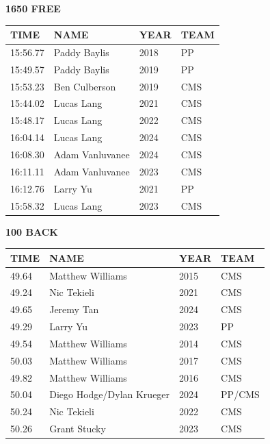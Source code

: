 \begin{table}[H]
\centering
\begin{minipage}[t]{0.48\textwidth}
\centering
\textbf{1650 FREE}\\[0.1cm]
\begin{tabular}{@{}p{1.8cm}p{2.8cm}p{1.2cm}p{1.4cm}@{}}
\hline
    \textbf{TIME} & \textbf{NAME} & \textbf{YEAR} & \textbf{TEAM} \\
\hline
    15:56.77 & Paddy Baylis & 2018 & PP \\
    15:49.57 & Paddy Baylis & 2019 & PP \\
    15:53.23 & Ben Culberson & 2019 & CMS \\
    15:44.02 & Lucas Lang & 2021 & CMS \\
    15:48.17 & Lucas Lang & 2022 & CMS \\
    16:04.14 & Lucas Lang & 2024 & CMS \\
    16:08.30 & Adam Vanluvanee & 2024 & CMS \\
    16:11.11 & Adam Vanluvanee & 2023 & CMS \\
    16:12.76 & Larry Yu & 2021 & PP \\
    15:58.32 & Lucas Lang & 2023 & CMS \\
\hline
\end{tabular}
\end{minipage}\hfill
\begin{minipage}[t]{0.48\textwidth}
\centering
\textbf{100 BACK}\\[0.1cm]
\begin{tabular}{@{}p{1.8cm}p{2.8cm}p{1.2cm}p{1.4cm}@{}}
\hline
    \textbf{TIME} & \textbf{NAME} & \textbf{YEAR} & \textbf{TEAM} \\
\hline
    49.64 & Matthew Williams & 2015 & CMS \\
    49.24 & Nic Tekieli & 2021 & CMS \\
    49.65 & Jeremy Tan & 2024 & CMS \\
    49.29 & Larry Yu & 2023 & PP \\
    49.54 & Matthew Williams & 2014 & CMS \\
    50.03 & Matthew Williams & 2017 & CMS \\
    49.82 & Matthew Williams & 2016 & CMS \\
    50.04 & Diego Hodge/Dylan Krueger & 2024 & PP/CMS \\
    50.24 & Nic Tekieli & 2022 & CMS \\
    50.26 & Grant Stucky & 2023 & CMS \\
\hline
\end{tabular}
\end{minipage}
\end{table}

